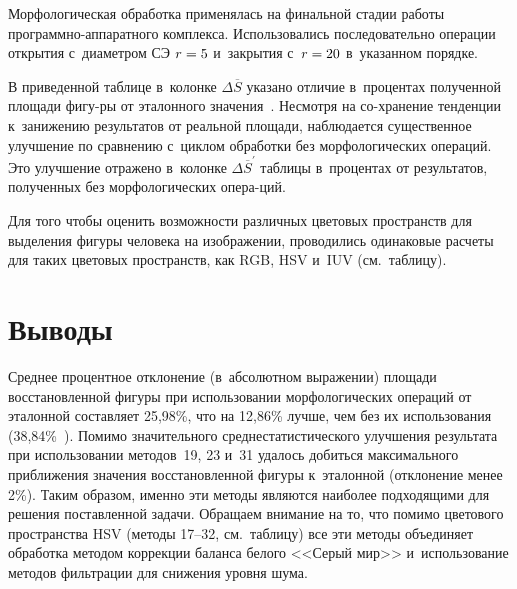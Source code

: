 \begin{multicols}{2}
  Морфологическая обработка применялась на финальной стадии работы
  про\-граммно-ап\-па\-рат\-но\-го комплекса. Использовались
последовательно операции открытия с~диаметром СЭ $r\hm = 5$ и~закрытия
с~$r \hm= 20$ в~указанном порядке.

  В приведенной таблице в~колонке $\Delta \overline{S}$ 
  указано отличие в~процентах полученной площади фигу-\linebreak ры от эталонного значения~\cite{9-ab}.
Несмотря на со-\linebreak хранение тенденции к~занижению результатов от реальной
площади, наблюдается существенное улучшение по сравнению с~циклом
обработки без морфологических операций. Это улучшение отражено в~колонке
$\Delta \overline{S}^\prime$ таблицы в~процентах от результатов, полученных
без морфологических опера-\linebreak ций.

  Для того чтобы оценить возможности различных цветовых пространств для
выделения фигуры человека на изображении, проводились одинаковые расчеты
для таких цветовых пространств, как RGB, HSV и~IUV (см.\ таблицу).



\section{Выводы}

  Среднее процентное отклонение (в~абсолютном выражении) площади
восстановленной фигуры при использовании морфологических операций от
эталонной составляет 25,98\%, что на 12,86\% лучше, чем без их использования
(38,84\%~\cite{9-ab}). Помимо значительного среднестатистического
улучшения результата при использовании методов~19, 23 и~31 удалось
добиться максимального приближения значения восстановленной фигуры 
к~эталонной (отклонение менее 2\%). Таким образом, именно эти методы
являются наиболее подходящими для решения поставленной задачи. Обращаем
внимание на то, что помимо цветового пространства HSV (методы 17--32, см.\
таблицу) все эти методы объединяет обработка методом коррекции баланса
белого <<Серый мир>> и~использование методов фильтрации для снижения
уровня шума.


\end{multicols}
